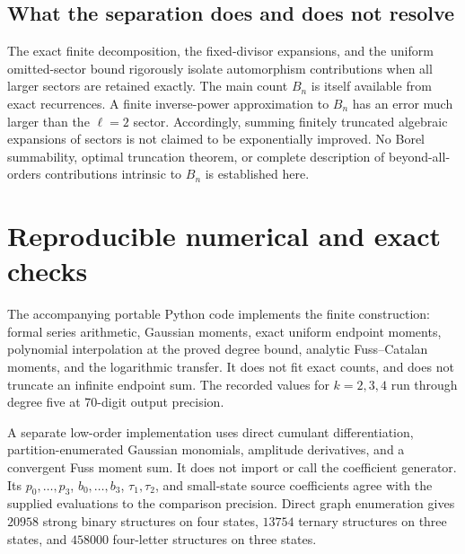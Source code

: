 \documentclass[11pt,letterpaper]{article}
\theoremstyle{remark}\newtheorem{remark}[theorem]{Remark}
\numberwithin{equation}{section}
\begin{document}
\subsection{What the separation does and does not resolve}
The exact finite decomposition, the fixed-divisor expansions, and the uniform omitted-sector bound rigorously isolate automorphism contributions when all larger sectors are retained exactly. The main count $B_n$ is itself available from exact recurrences. A finite inverse-power approximation to $B_n$ has an error much larger than the $\ell=2$ sector. Accordingly, summing finitely truncated algebraic expansions of sectors is not claimed to be exponentially improved. No Borel summability, optimal truncation theorem, or complete description of beyond-all-orders contributions intrinsic to $B_n$ is established here.

\section{Reproducible numerical and exact checks}\label{asa:str:sec:checks}
The accompanying portable Python code implements the finite construction: formal series arithmetic, Gaussian moments, exact uniform endpoint moments, polynomial interpolation at the proved degree bound, analytic Fuss--Catalan moments, and the logarithmic transfer. It does not fit exact counts, and does not truncate an infinite endpoint sum. The recorded values for $k=2,3,4$ run through degree five at 70-digit output precision.

A separate low-order implementation uses direct cumulant differentiation, partition-enumerated Gaussian monomials, amplitude derivatives, and a convergent Fuss moment sum. It does not import or call the coefficient generator. Its $p_0,\ldots,p_3$, $b_0,\ldots,b_3$, $\tau_1,\tau_2$, and small-state source coefficients agree with the supplied evaluations to the comparison precision. Direct graph enumeration gives $20958$ strong binary structures on four states, $13754$ ternary structures on three states, and $458000$ four-letter structures on three states.
\end{document}
